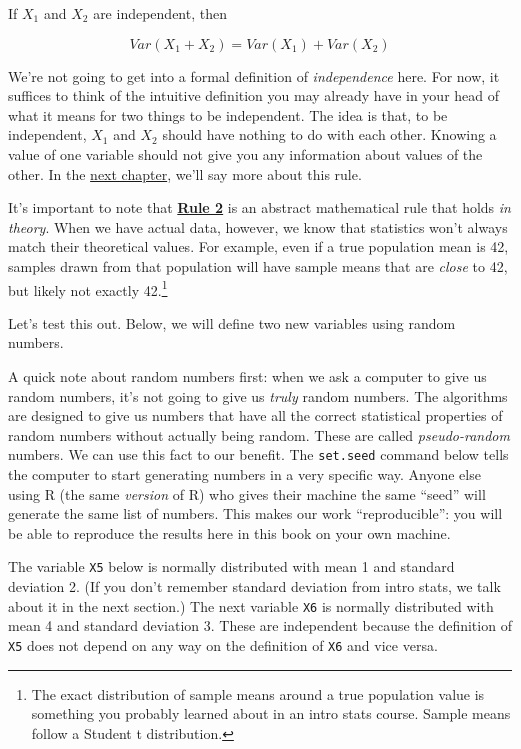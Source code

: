 \documentclass[
]{book}
\begin{document}
If \(X_{1}\) and \(X_{2}\) are independent, then

\[
Var\left(X_{1} + X_{2}\right) =
Var\left(X_{1}\right) + Var\left(X_{2}\right)
\]

We're not going to get into a formal definition of \emph{independence} here. For now, it suffices to think of the intuitive definition you may already have in your head of what it means for two things to be independent. The idea is that, to be independent, \(X_{1}\) and \(X_{2}\) should have nothing to do with each other. Knowing a value of one variable should not give you any information about values of the other. In the \protect\hyperlink{covariance}{next chapter}, we'll say more about this rule.

It's important to note that \protect\hyperlink{Rule2}{\textbf{Rule 2}} is an abstract mathematical rule that holds \emph{in theory}. When we have actual data, however, we know that statistics won't always match their theoretical values. For example, even if a true population mean is 42, samples drawn from that population will have sample means that are \emph{close} to 42, but likely not exactly 42.\footnote{The exact distribution of sample means around a true population value is something you probably learned about in an intro stats course. Sample means follow a Student t distribution.}

Let's test this out. Below, we will define two new variables using random numbers.

A quick note about random numbers first: when we ask a computer to give us random numbers, it's not going to give us \emph{truly} random numbers. The algorithms are designed to give us numbers that have all the correct statistical properties of random numbers without actually being random. These are called \emph{pseudo-random} numbers. We can use this fact to our benefit. The \texttt{set.seed} command below tells the computer to start generating numbers in a very specific way. Anyone else using R (the same \emph{version} of R) who gives their machine the same ``seed'' will generate the same list of numbers. This makes our work ``reproducible'': you will be able to reproduce the results here in this book on your own machine.

The variable \texttt{X5} below is normally distributed with mean 1 and standard deviation 2. (If you don't remember standard deviation from intro stats, we talk about it in the next section.) The next variable \texttt{X6} is normally distributed with mean 4 and standard deviation 3. These are independent because the definition of \texttt{X5} does not depend on any way on the definition of \texttt{X6} and vice versa.
\end{document}
